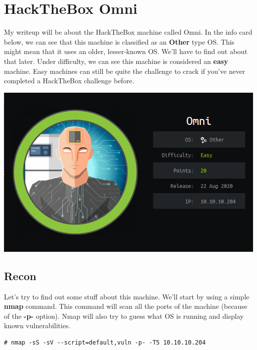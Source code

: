 \documentclass[../main.tex]{subfiles}
\begin{document}
\section{HackTheBox Omni}

My writeup will be about the HackTheBox machine called Omni. In the info card below, we can see that this machine is classified as an \textbf{Other} type OS. This might mean that it uses an older, lesser-known OS. We'll have to find out about that later. Under difficulty, we can see this machine is considered an \textbf{easy} machine. Easy machines can still be quite the challenge to crack if you've never completed a HackTheBox challenge before.
    
\begin{center}
  \includegraphics[width=0.75\linewidth]{images/Wannes/omni_info.png}
\end{center}

\subsection{Recon}

Let's try to find out some stuff about this machine. We'll start by using a simple \textbf{nmap} command. This command will scan all the ports of the machine (because of the \textbf{-p-} option). Nmap will also try to guess what OS is running and display known vulnerabilities.

\begin{lstlisting}
# nmap -sS -sV --script=default,vuln -p- -T5 10.10.10.204
\end{lstlisting}
\end{document}
